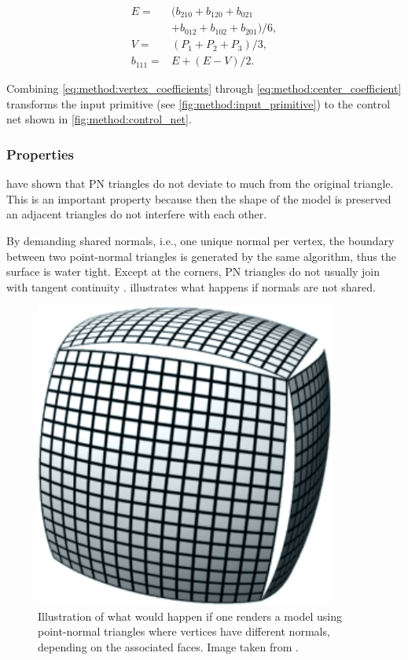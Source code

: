 \begin{align}\label{eq:method:center_coefficient}
	E = {}& (b_{210} + b_{120} + b_{021} \nonumber \\
		{}& + b_{012} + b_{102} + b_{201}) / 6, \nonumber\\
	V = {}& (P_1 + P_2 + P_3) / 3, \\
	b_{111} = {}& E + (E - V) / 2. \nonumber
\end{align}

Combining \eqref{eq:method:vertex_coefficients} through \eqref{eq:method:center_coefficient} transforms the input primitive (see \cref{fig:method:input_primitive}) to the control net shown in \cref{fig:method:control_net}.

\subsubsection{Properties}
\citeauthor{vlachos2001curved} have shown that PN triangles do not deviate to much from the original triangle. This is an important property because then the shape of the model is preserved an adjacent triangles do not interfere with each other. 

By demanding shared normals, i.e., one unique normal per vertex, the boundary between two point-normal triangles is generated by the same algorithm, thus the surface is water tight. Except at the corners, PN triangles do not usually join with tangent continuity \cite{vlachos2001curved}.  illustrates what happens if normals are not shared.

\begin{figure}
	\centering
	\includegraphics[width=0.4\columnwidth]{./content/img/method/cracks.png}
	\caption{Illustration of what would happen if one renders a model using point-normal triangles where vertices have different normals, depending on the associated faces. Image taken from \cite{mcdonald2010crack}.}
	\label{fig:method:cracks}
\end{figure}
